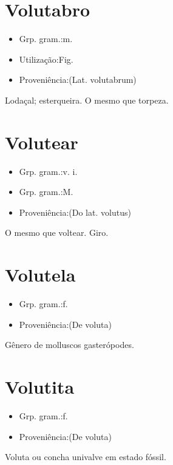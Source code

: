 \documentclass{article}
\begin{document}
\section{Volutabro}
\begin{itemize}
\item {Grp. gram.:m.}
\end{itemize}
\begin{itemize}
\item {Utilização:Fig.}
\end{itemize}
\begin{itemize}
\item {Proveniência:(Lat. \textunderscore volutabrum\textunderscore )}
\end{itemize}
Lodaçal; esterqueira.
O mesmo que \textunderscore torpeza\textunderscore .
\section{Volutear}
\begin{itemize}
\item {Grp. gram.:v. i.}
\end{itemize}
\begin{itemize}
\item {Grp. gram.:M.}
\end{itemize}
\begin{itemize}
\item {Proveniência:(Do lat. \textunderscore volutus\textunderscore )}
\end{itemize}
O mesmo que \textunderscore voltear\textunderscore .
Giro.
\section{Volutela}
\begin{itemize}
\item {Grp. gram.:f.}
\end{itemize}
\begin{itemize}
\item {Proveniência:(De \textunderscore voluta\textunderscore )}
\end{itemize}
Gênero de molluscos gasterópodes.
\section{Volutita}
\begin{itemize}
\item {Grp. gram.:f.}
\end{itemize}
\begin{itemize}
\item {Proveniência:(De \textunderscore voluta\textunderscore )}
\end{itemize}
Voluta ou concha univalve em estado fóssil.
\end{document}
